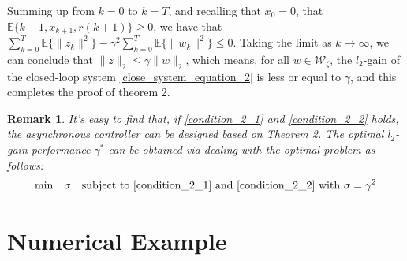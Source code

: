 \documentclass[conference]{IEEEtran}
\newtheorem{remark}{Remark}
\begin{document}
Summing up from $k=0$ to $k=T$, and recalling that $x_{0} =0$, that $\mathbb{E}\{k+1,x_{k+1},r(k+1)\}\geq0 $, we have that $\sum_{k=0}^{T}\mathbb{E}\{ \|z_{k}\|^{2} \}-\gamma^{2}\sum_{k=0}^{T}\mathbb{E}\{\|w_{k}\|^{2}\}\leq0 $. Taking the limit as $k\to \infty$, we can conclude that $\|z\|_{2}\leq\gamma\|w\|_{2}$, which means, for all $w\in \mathcal{W}_{\zeta}$, the $l_{2}$-gain of the closed-loop system \eqref{close_system_equation_2} is less or equal to $\gamma$, and this completes the proof of theorem 2.
\begin{remark}
	It's easy to find that, if \eqref{condition_2_1} and \eqref{condition_2_2} holds, the asynchronous controller can be designed based on Theorem 2. The optimal $l_2$-gain performance $\gamma^{*}$ can be obtained via dealing with the optimal problem as follows: 
	\begin{equation} \label{min_gamma_index}
	\mathrm{min}\quad \sigma \quad \mathrm{subject \ to} \ \eqref{condition_2_1} \ \mathrm{and} \ \eqref{condition_2_2} \ \mathrm{with} \ \sigma=\gamma^{2} 
	\end{equation}
\end{remark}


\section{Numerical Example}
\end{document}

